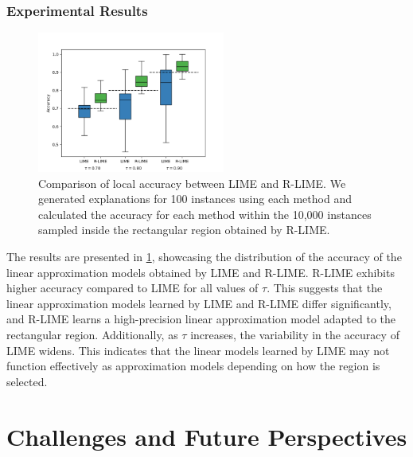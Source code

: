 \documentclass[runningheads]{llncs}
\begin{document}
\subsubsection{Experimental Results}
\begin{figure}[tbp]
  \centering
  \includegraphics[width=0.55\textwidth]{python/exp2/box_plot}
  \caption[Comparison of Local Accuracy between R-LIME and LIME]{%
    Comparison of local accuracy between LIME and R-LIME.
    We generated explanations for 100 instances using each method
    and calculated the accuracy for each method within the 10,000 instances
    sampled inside the rectangular region obtained by R-LIME.
  }\label{fig:box_plot}
\end{figure}
The results are presented in \cref{fig:box_plot}, showcasing the distribution of the accuracy of the linear approximation models obtained by LIME and R-LIME.
R-LIME exhibits higher accuracy compared to LIME for all values of $\tau$. This suggests that the linear approximation models learned by LIME and R-LIME differ significantly, and R-LIME learns a high-precision linear approximation model adapted to the rectangular region. Additionally, as $\tau$ increases, the variability in the accuracy of LIME widens. This indicates that the linear models learned by LIME may not function effectively as approximation models depending on how the region is selected.

\section{Challenges and Future Perspectives}
 
\end{document}
